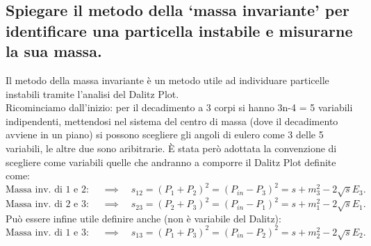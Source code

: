 \subsection[]{ Spiegare il metodo della ‘massa invariante’ per identificare una particella instabile e misurarne la sua massa.}
Il metodo della massa invariante è un metodo utile ad individuare particelle instabili tramite l'analisi del Dalitz Plot.\\
Ricominciamo dall'inizio: per il decadimento a 3 corpi si hanno 3n-4 = 5 variabili indipendenti, mettendosi nel sistema del centro di massa (dove il decadimento avviene in un piano) si possono scegliere gli angoli di eulero come 3 delle 5 variabili, le altre due sono aribitrarie.
È stata però adottata la convenzione di scegliere come variabili quelle che andranno a comporre il Dalitz Plot definite come:
\[
	\text{Massa inv. di 1 e 2: }  \quad \implies \quad 
	s_{12} = \left( P_1 + P_2 \right)^2 = \left( P_{in} - P_3 \right)^2 = s + m_3^2 - 2\sqrt{s} E_3 
.\] 
\[
	\text{Massa inv. di 2 e 3: } \quad \implies \quad  
	s_{23} = \left( P_2 + P_3 \right)^2 = \left( P_{in} - P_1 \right)^2 = s + m_1^2 -2 \sqrt{s} E_1 
.\] 
Può essere infine utile definire anche (non è variabile del Dalitz):
\[
	\text{Massa inv. di 1 e 3: }  \quad \implies \quad 
	s_{13} = \left( P_1 + P_3 \right)^2 = \left( P_{in} - P_2 \right)^2 = s + m_2^2 - 2\sqrt{s} E_2 
.\] 

